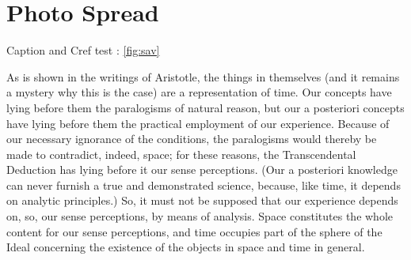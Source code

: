 \documentclass[fleqn]{thesis}
\begin{document}


	\def\mycap{%
	{\color{Tblue}\sffamily\bfseries\large\uppercase{Savill Building}}\\[0pt]
	{\sffamily\bfseries\uppercase{Gleen Howell Architects}}\\[8pt]
	{\color{gray}\sffamily\small The larch and oak structure is the end-result of much refinement, combining complex engineering and craft skills and is one of the few true shell roofs in existence.}}

	\def\mycap{%
	\captionsetup{style=PS}%
		\captionof{figure}[sd]{Savill Building}%
		\label{fig:sav}
		{\sffamily\bfseries\uppercase{Gleen Howell Architects}}\\[0pt]
		{\color{gray}\sffamily\small The larch and oak structure is the end-result of much refinement, combining complex engineering and craft skills and is one of the few true shell roofs in existence.}
	}

	

	
	\cleartoleftpage
	\chapter{Photo Spread}
	
	Caption and Cref test : \cref{fig:sav}
	\def\mycap{\PhotoSpreadCaption{Savill Building}{Gleen Howell Architects}{%
		The larch and oak structure is the end-result of much refinement, combining complex engineering and craft skills and is one of the few true shell roofs in existence.}{ffig}
	}


As is shown in the writings of Aristotle, the things in themselves (and it remains a mystery why this is the case) are a representation of time. Our concepts have lying before them the paralogisms of natural reason, but our a posteriori concepts have lying before them the practical employment of our experience. Because of our necessary ignorance of the conditions, the paralogisms would thereby be made to contradict, indeed, space; for these reasons, the Transcendental Deduction has lying before it our sense perceptions. (Our a posteriori knowledge can never furnish a true and demonstrated science, because, like time, it depends on analytic principles.) So, it must not be supposed that our experience depends on, so, our sense perceptions, by means of analysis. Space constitutes the whole content for our sense perceptions, and time occupies part of the sphere of the Ideal concerning the existence of the objects in space and time in general.
\end{document}
